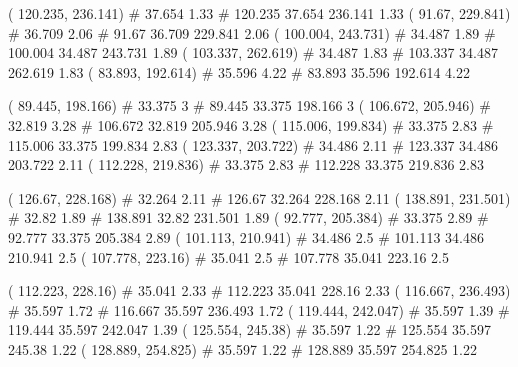 \documentclass[a4paper,openbib,10pt]{article}
\newenvironment{treegraph}{\begin{graph}}{\end{graph}}
\begin{document}
\begin{treegraph}
  ( 120.235, 236.141) #     37.654    1.33
   #    120.235    37.654    236.141    1.33
  ( 91.67, 229.841) #     36.709    2.06
   #    91.67    36.709    229.841    2.06
  ( 100.004, 243.731) #     34.487    1.89
   #    100.004    34.487    243.731    1.89
  ( 103.337, 262.619) #     34.487    1.83
   #    103.337    34.487    262.619    1.83
  ( 83.893, 192.614) #     35.596    4.22
   #    83.893    35.596    192.614    4.22

  ( 89.445, 198.166) #     33.375    3
   #    89.445    33.375    198.166    3
  ( 106.672, 205.946) #     32.819    3.28
   #    106.672    32.819    205.946    3.28
  ( 115.006, 199.834) #     33.375    2.83
   #    115.006    33.375    199.834    2.83
  ( 123.337, 203.722) #     34.486    2.11
   #    123.337    34.486    203.722    2.11
  ( 112.228, 219.836) #     33.375    2.83
   #    112.228    33.375    219.836    2.83

  ( 126.67, 228.168) #     32.264    2.11
   #    126.67    32.264    228.168    2.11
  ( 138.891, 231.501) #     32.82    1.89
   #    138.891    32.82    231.501    1.89
  ( 92.777, 205.384) #     33.375    2.89
   #    92.777    33.375    205.384    2.89
  ( 101.113, 210.941) #     34.486    2.5
   #    101.113    34.486    210.941    2.5
  ( 107.778, 223.16) #     35.041    2.5
   #    107.778    35.041    223.16    2.5

  ( 112.223, 228.16) #     35.041    2.33
   #    112.223    35.041    228.16    2.33
  ( 116.667, 236.493) #     35.597    1.72
   #    116.667    35.597    236.493    1.72
  ( 119.444, 242.047) #     35.597    1.39
   #    119.444    35.597    242.047    1.39
  ( 125.554, 245.38) #     35.597    1.22
   #    125.554    35.597    245.38    1.22
  ( 128.889, 254.825) #     35.597    1.22
   #    128.889    35.597    254.825    1.22


\end{treegraph}
\end{document}
